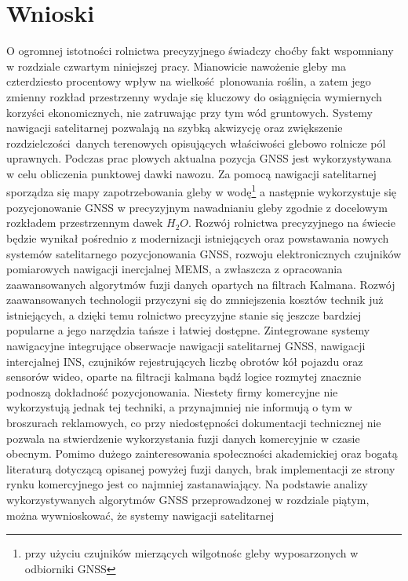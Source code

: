 \section{Wnioski}
O ogromnej istotności rolnictwa precyzyjnego świadczy choćby fakt wspomniany w rozdziale czwartym niniejszej pracy. Mianowicie nawożenie gleby ma czterdziesto 
procentowy wpływ na wielkość plonowania roślin, a zatem jego zmienny rozkład przestrzenny wydaje się kluczowy do osiągnięcia wymiernych korzyści ekonomicznych,
nie zatruwając przy tym wód gruntowych. Systemy nawigacji satelitarnej pozwalają na szybką akwizycję oraz zwiększenie rozdzielczości danych terenowych
opisujących właściwości glebowo rolnicze pól uprawnych. Podczas prac plowych aktualna pozycja GNSS jest wykorzystywana w celu obliczenia punktowej dawki nawozu.\newline
\indent Za pomocą nawigacji satelitarnej sporządza się mapy zapotrzebowania gleby w wodę\footnote{przy użyciu czujników mierzących wilgotnośc gleby wyposarzonych w 
odbiorniki GNSS} a następnie wykorzystuje się pozycjonowanie GNSS w precyzyjnym nawadnianiu gleby zgodnie z docelowym rozkładem przestrzennym dawek $H_2O$.
\indent Rozwój rolnictwa precyzyjnego na świecie będzie wynikał pośrednio z modernizacji istniejących  oraz powstawania nowych systemów satelitarnego pozycjonowania GNSS,
rozwoju elektronicznych czujników pomiarowych nawigacji inercjalnej MEMS, a zwłaszcza z opracowania zaawansowanych algorytmów fuzji danych opartych na filtrach Kalmana.
Rozwój zaawansowanych technologii przyczyni się do zmniejszenia kosztów technik już istniejących, a dzięki temu rolnictwo precyzyjne stanie się jeszcze bardziej
popularne a jego narzędzia tańsze i łatwiej dostępne.\newline
\indent Zintegrowane systemy nawigacyjne integrujące obserwacje nawigacji satelitarnej GNSS, nawigacji intercjalnej INS, czujników rejestrujących liczbę obrotów kół pojazdu
oraz sensorów wideo, oparte na filtracji kalmana bądź logice rozmytej znacznie podnoszą dokładność pozycjonowania. Niestety firmy komercyjne
nie wykorzystują jednak tej techniki, a przynajmniej nie informują o tym w broszurach reklamowych, co przy niedostępności dokumentacji technicznej nie pozwala na 
stwierdzenie wykorzystania fuzji danych komercyjnie w czasie obecnym. Pomimo dużego zainteresowania społeczności akademickiej oraz bogatą literaturą dotyczącą opisanej powyżej 
fuzji danych, brak implementacji ze strony rynku komercyjnego jest co najmniej zastanawiający.\newline
\indent Na podstawie analizy wykorzystywanych algorytmów GNSS przeprowadzonej w rozdziale piątym, można wywnioskować, że systemy nawigacji satelitarnej 

